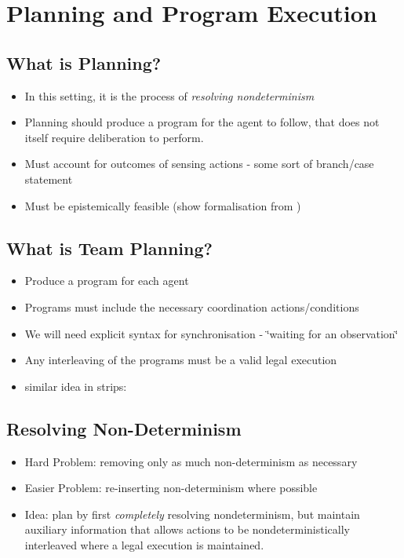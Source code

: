  


\chapter{Planning and Program Execution}

\label{ch:planning} %



\section{What is Planning?}

\begin{itemize}
\item In this setting, it is the process of \emph{resolving nondeterminism} 
\item Planning should produce a program for the agent to follow, that does
not itself require deliberation to perform. \cite{levesque96what_is_planning,giacomo04sem_delib_indigolog} 
\item Must account for outcomes of sensing actions - some sort of branch/case
statement 
\item Must be epistemically feasible (show formalisation from \cite{giacomo04sem_delib_indigolog}) 
\end{itemize}

\section{What is Team Planning?}

\begin{itemize}
\item Produce a program for each agent 
\item Programs must include the necessary coordination actions/conditions 
\item We will need explicit syntax for synchronisation - \char`\"{}waiting
for an observation\char`\"{} 
\item Any interleaving of the programs must be a valid legal execution 
\item similar idea in strips: \cite{boutilier01partialorder_conc} 
\end{itemize}

\section{Resolving Non-Determinism}

\begin{itemize}
\item Hard Problem: removing only as much non-determinism as necessary 
\item Easier Problem: re-inserting non-determinism where possible 
\item Idea: plan by first \emph{completely} resolving nondeterminism, but
maintain auxiliary information that allows actions to be nondeterministically
interleaved where a legal execution is maintained. 
\end{itemize}

